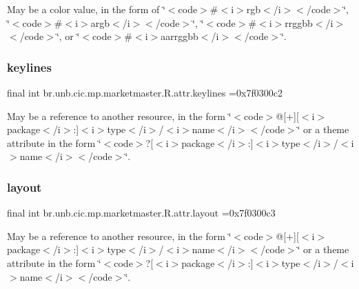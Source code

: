 May be a color value, in the form of \char`\"{}$<$code$>$\#$<$i$>$rgb$<$/i$>$$<$/code$>$\char`\"{}, \char`\"{}$<$code$>$\#$<$i$>$argb$<$/i$>$$<$/code$>$\char`\"{}, \char`\"{}$<$code$>$\#$<$i$>$rrggbb$<$/i$>$$<$/code$>$\char`\"{}, or \char`\"{}$<$code$>$\#$<$i$>$aarrggbb$<$/i$>$$<$/code$>$\char`\"{}. \mbox{\label{classbr_1_1unb_1_1cic_1_1mp_1_1marketmaster_1_1R_1_1attr_a0c6b16d9b79f7c7ff855393926b7434f}} 
\subsubsection{\texorpdfstring{keylines}{keylines}}
{\footnotesize\ttfamily final int br.\+unb.\+cic.\+mp.\+marketmaster.\+R.\+attr.\+keylines =0x7f0300c2\hspace{0.3cm}{\ttfamily [static]}}

May be a reference to another resource, in the form \char`\"{}$<$code$>$@\mbox{[}+\mbox{]}\mbox{[}$<$i$>$package$<$/i$>$\+:\mbox{]}$<$i$>$type$<$/i$>$/$<$i$>$name$<$/i$>$$<$/code$>$\char`\"{} or a theme attribute in the form \char`\"{}$<$code$>$?\mbox{[}$<$i$>$package$<$/i$>$\+:\mbox{]}$<$i$>$type$<$/i$>$/$<$i$>$name$<$/i$>$$<$/code$>$\char`\"{}. \mbox{\label{classbr_1_1unb_1_1cic_1_1mp_1_1marketmaster_1_1R_1_1attr_ae9181a278b9de48b952458be03a73a3e}} 
\subsubsection{\texorpdfstring{layout}{layout}}
{\footnotesize\ttfamily final int br.\+unb.\+cic.\+mp.\+marketmaster.\+R.\+attr.\+layout =0x7f0300c3\hspace{0.3cm}{\ttfamily [static]}}

May be a reference to another resource, in the form \char`\"{}$<$code$>$@\mbox{[}+\mbox{]}\mbox{[}$<$i$>$package$<$/i$>$\+:\mbox{]}$<$i$>$type$<$/i$>$/$<$i$>$name$<$/i$>$$<$/code$>$\char`\"{} or a theme attribute in the form \char`\"{}$<$code$>$?\mbox{[}$<$i$>$package$<$/i$>$\+:\mbox{]}$<$i$>$type$<$/i$>$/$<$i$>$name$<$/i$>$$<$/code$>$\char`\"{}. \mbox{\label{classbr_1_1unb_1_1cic_1_1mp_1_1marketmaster_1_1R_1_1attr_a545d0850c35908059f49e5aabb2ab936}} 
